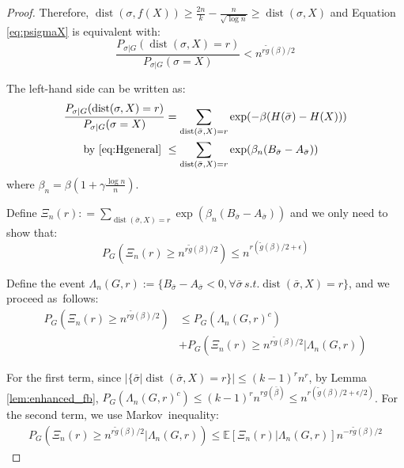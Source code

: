 \documentclass[entropy,article,accept,moreauthors,pdftex]{Definitions/mdpi}
\newcommand{\1}{\mathbbm{1}}
\DeclareMathOperator{\Dist}{dist}
\begin{document}
\begin{paracol}{2}
\begin{proof}
Therefore, $\Dist(\sigma, f(X)) \geq \frac{2n}{k} - \frac{n}{\sqrt{\log n}} \geq \Dist(\sigma, X)$ and Equation
\eqref{eq:psigmaX} is equivalent with:
\begin{equation}\label{eq:psigmaX2}
\frac{P_{\sigma|G}(\Dist(\sigma, X)=r)}
{P_{\sigma|G}(\sigma=X)} <
n^{r \tilde{g}(\beta) /2}
\end{equation}

The left-hand side can be written as:
\begin{align*}
\frac{P_{\sigma|G}(\Dist(\sigma, X)=r)}
{P_{\sigma|G}(\sigma=X)}  &= \sum_{\Dist(\bar{\sigma}, X)=r}\exp(-\beta(H(\bar{\sigma})-H(X)))\\
\textrm{ by \eqref{eq:Hgeneral} } &\leq \sum_{\Dist(\bar{\sigma}, X)=r}\exp(\beta_n(B_{\bar{\sigma}}-A_{\bar{\sigma}}))
\end{align*}
where $\beta_n = \beta(1+\gamma\frac{\log n}{n})$.

Define $\Xi_n(r): = \sum_{\Dist(\bar{\sigma}, X)=r}\exp(\beta_n(B_{\bar{\sigma}}-A_{\bar{\sigma}}))$ and we only need to show that:
\begin{equation}
P_{G}(\Xi_n(r) \geq n^{r \tilde{g}(\beta) /2}) \leq  n^{r (\tilde{g}(\beta) /2 + \epsilon)}
\end{equation}

Define the event $\Lambda_n(G,r):=\{B_{\bar{\sigma}} -A_{\bar{\sigma}} < 0, \forall \bar{\sigma}\, s.t. \Dist(\bar{\sigma}, X)=r\}$,
and we proceed as~follows:
\begin{align*}
P_{G}(\Xi_n(r) \geq n^{r \tilde{g}(\beta) /2}) &\leq
P_G(\Lambda_n(G,r)^c) \\
&+ P_G(\Xi_n(r) \geq n^{r \tilde{g}(\beta) /2} |\Lambda_n(G,r) )
\end{align*}

For the first term, since $|\{ \bar{\sigma} | \Dist(\bar{\sigma}, X) = r \}|  \leq (k-1)^r n^r$,
by Lemma \ref{lem:enhanced_fb},\linebreak
$P_G(\Lambda_n(G,r)^c) \leq (k-1)^r n^{rg(\bar{\beta})} \leq n^{r (\tilde{g}(\beta) /2 + \epsilon/2)}$.
For the second term, we use Markov~inequality:
\begin{align*}
P_G(\Xi_n(r) \geq n^{r \tilde{g}(\beta) /2} |\Lambda_n(G,r) )
\leq \mathbb{E}[\Xi_n(r)|\Lambda_n(G,r)]n^{-r \tilde{g}(\beta) /2} 
\end{align*}


\end{proof}
\end{paracol}
\end{document}
